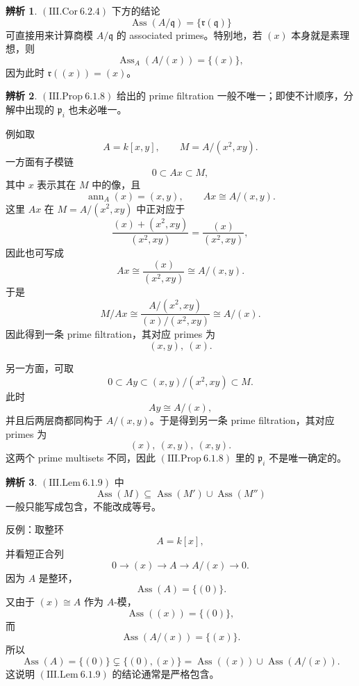 \documentclass[a4paper]{ctexart}
\theoremstyle{definition}
\theoremstyle{analysis}
\newtheorem{remark}{辨析}[section]
\theoremstyle{plain}
\begin{document}
\label{rem:ass-quotient-radical}
\begin{remark}
\((\mathrm{III.Cor}\ 6.2.4)\) 下方的结论
\[
  \operatorname{Ass}(A/\mathfrak q)=\{\mathfrak r(\mathfrak q)\}
\]
可直接用来计算商模 \(A/\mathfrak q\) 的 associated primes。特别地，若 \((x)\) 本身就是素理想，则
\[
  \operatorname{Ass}_A(A/(x))=\{(x)\},
\]
因为此时 \(\mathfrak r((x))=(x)\)。
\end{remark}

\begin{remark}
\label{rem:prime-filtration-nonunique}
\((\mathrm{III.Prop}\ 6.1.8)\) 给出的 prime filtration 一般不唯一；即使不计顺序，分解中出现的 \(\mathfrak p_i\) 也未必唯一。

例如取
\[
  A=k[x,y],\qquad M=A/(x^2,xy).
\]
一方面有子模链
\[
  0\subset Ax\subset M,
\]
其中 \(x\) 表示其在 \(M\) 中的像，且
\[
  \operatorname{ann}_A(x)=(x,y),
  \qquad
  Ax\cong A/(x,y).
\]
这里 \(Ax\) 在 \(M=A/(x^2,xy)\) 中正对应于
\[
  \frac{(x)+(x^2,xy)}{(x^2,xy)}
  =
  \frac{(x)}{(x^2,xy)},
\]
因此也可写成
\[
  Ax\cong \frac{(x)}{(x^2,xy)}\cong A/(x,y).
\]
于是
\[
  M/Ax
  \cong
  \frac{A/(x^2,xy)}{(x)/(x^2,xy)}
  \cong
  A/(x).
\]
因此得到一条 prime filtration，其对应 primes 为
\[
  (x,y),\ (x).
\]

另一方面，可取
\[
  0\subset Ay\subset (x,y)/(x^2,xy)\subset M.
\]
此时
\[
  Ay\cong A/(x),
\]
并且后两层商都同构于 \(A/(x,y)\)。于是得到另一条 prime filtration，其对应 primes 为
\[
  (x),\ (x,y),\ (x,y).
\]
这两个 prime multisets 不同，因此 \((\mathrm{III.Prop}\ 6.1.8)\) 里的 \(\mathfrak p_i\) 不是唯一确定的。
\end{remark}

\begin{remark}
\label{rem:ass-short-exact-strict}
\((\mathrm{III.Lem}\ 6.1.9)\) 中
\[
  \operatorname{Ass}(M)\subseteq \operatorname{Ass}(M')\cup \operatorname{Ass}(M'')
\]
一般只能写成包含，不能改成等号。

反例：取整环
\[
  A=k[x],
\]
并看短正合列
\[
  0\to (x)\to A\to A/(x)\to 0.
\]
因为 \(A\) 是整环，
\[
  \operatorname{Ass}(A)=\{(0)\}.
\]
又由于 \((x)\cong A\) 作为 \(A\)-模，
\[
  \operatorname{Ass}((x))=\{(0)\},
\]
而
\[
  \operatorname{Ass}(A/(x))=\{(x)\}.
\]
所以
\[
  \operatorname{Ass}(A)=\{(0)\}
  \subsetneq
  \{(0),(x)\}
  =
  \operatorname{Ass}((x))\cup \operatorname{Ass}(A/(x)).
\]
这说明 \((\mathrm{III.Lem}\ 6.1.9)\) 的结论通常是严格包含。
\end{remark}
\end{document}
